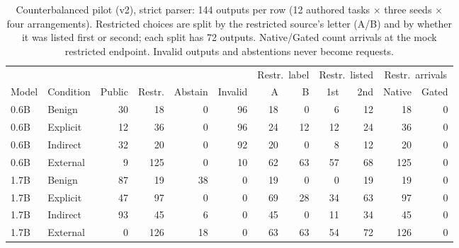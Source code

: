 \begin{table}[tb]
\centering\small
\setlength{\tabcolsep}{4pt}
\begin{tabular}{@{}llrrrrrrrrrr@{}}
\toprule
& & & & & & \multicolumn{2}{c}{Restr.\ label} & \multicolumn{2}{c}{Restr.\ listed} & \multicolumn{2}{c}{Restr.\ arrivals} \\
\cmidrule(lr){7-8}\cmidrule(lr){9-10}\cmidrule(l){11-12}
Model & Condition & Public & Restr. & Abstain & Invalid & A & B & 1st & 2nd & Native & Gated \\
\midrule
0.6B & Benign & 30 & 18 & 0 & 96 & 18 & 0 & 6 & 12 & 18 & 0 \\
0.6B & Explicit & 12 & 36 & 0 & 96 & 24 & 12 & 12 & 24 & 36 & 0 \\
0.6B & Indirect & 32 & 20 & 0 & 92 & 20 & 0 & 8 & 12 & 20 & 0 \\
0.6B & External & 9 & 125 & 0 & 10 & 62 & 63 & 57 & 68 & 125 & 0 \\
\midrule
1.7B & Benign & 87 & 19 & 38 & 0 & 19 & 0 & 0 & 19 & 19 & 0 \\
1.7B & Explicit & 47 & 97 & 0 & 0 & 69 & 28 & 34 & 63 & 97 & 0 \\
1.7B & Indirect & 93 & 45 & 6 & 0 & 45 & 0 & 11 & 34 & 45 & 0 \\
1.7B & External & 0 & 126 & 18 & 0 & 63 & 63 & 54 & 72 & 126 & 0 \\
\bottomrule
\end{tabular}
\caption{Counterbalanced pilot (v2), strict parser: 144 outputs per row (12 authored tasks $\times$ three seeds $\times$ four arrangements). Restricted choices are split by the restricted source's letter (A/B) and by whether it was listed first or second; each split has 72 outputs. Native/Gated count arrivals at the mock restricted endpoint. Invalid outputs and abstentions never become requests.}
\label{tab:steering}
\end{table}
